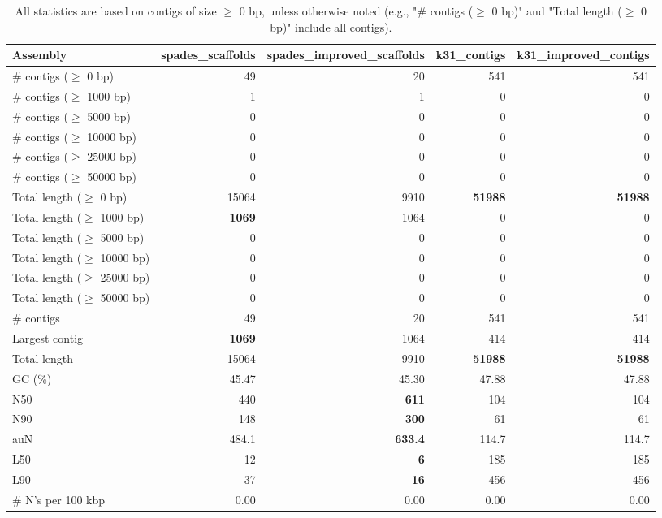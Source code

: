 \documentclass[12pt,a4paper]{article}
\begin{document}
\begin{table}[ht]
\begin{center}
\caption{All statistics are based on contigs of size $\geq$ 0 bp, unless otherwise noted (e.g., "\# contigs ($\geq$ 0 bp)" and "Total length ($\geq$ 0 bp)" include all contigs).}
\begin{tabular}{|l*{4}{|r}|}
\hline
Assembly & spades\_scaffolds & spades\_improved\_scaffolds & k31\_contigs & k31\_improved\_contigs \\ \hline
\# contigs ($\geq$ 0 bp) & 49 & 20 & 541 & 541 \\ \hline
\# contigs ($\geq$ 1000 bp) & 1 & 1 & 0 & 0 \\ \hline
\# contigs ($\geq$ 5000 bp) & 0 & 0 & 0 & 0 \\ \hline
\# contigs ($\geq$ 10000 bp) & 0 & 0 & 0 & 0 \\ \hline
\# contigs ($\geq$ 25000 bp) & 0 & 0 & 0 & 0 \\ \hline
\# contigs ($\geq$ 50000 bp) & 0 & 0 & 0 & 0 \\ \hline
Total length ($\geq$ 0 bp) & 15064 & 9910 & {\bf 51988} & {\bf 51988} \\ \hline
Total length ($\geq$ 1000 bp) & {\bf 1069} & 1064 & 0 & 0 \\ \hline
Total length ($\geq$ 5000 bp) & 0 & 0 & 0 & 0 \\ \hline
Total length ($\geq$ 10000 bp) & 0 & 0 & 0 & 0 \\ \hline
Total length ($\geq$ 25000 bp) & 0 & 0 & 0 & 0 \\ \hline
Total length ($\geq$ 50000 bp) & 0 & 0 & 0 & 0 \\ \hline
\# contigs & 49 & 20 & 541 & 541 \\ \hline
Largest contig & {\bf 1069} & 1064 & 414 & 414 \\ \hline
Total length & 15064 & 9910 & {\bf 51988} & {\bf 51988} \\ \hline
GC (\%) & 45.47 & 45.30 & 47.88 & 47.88 \\ \hline
N50 & 440 & {\bf 611} & 104 & 104 \\ \hline
N90 & 148 & {\bf 300} & 61 & 61 \\ \hline
auN & 484.1 & {\bf 633.4} & 114.7 & 114.7 \\ \hline
L50 & 12 & {\bf 6} & 185 & 185 \\ \hline
L90 & 37 & {\bf 16} & 456 & 456 \\ \hline
\# N's per 100 kbp & 0.00 & 0.00 & 0.00 & 0.00 \\ \hline
\end{tabular}
\end{center}
\end{table}
\end{document}
